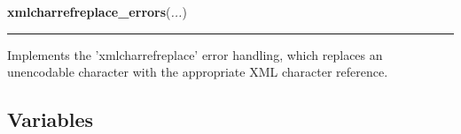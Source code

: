     \label{codecs:xmlcharrefreplace_errors}

    \vspace{0.5ex}

\hspace{.8\funcindent}\begin{boxedminipage}{\funcwidth}

    \raggedright \textbf{xmlcharrefreplace\_errors}(\textit{...})

    \vspace{-1.5ex}

    \rule{\textwidth}{0.5\fboxrule}
\setlength{\parskip}{2ex}
    Implements the 'xmlcharrefreplace' error handling, which replaces an 
    unencodable character with the appropriate XML character reference.

\setlength{\parskip}{1ex}
    \end{boxedminipage}



  \subsection{Variables}

